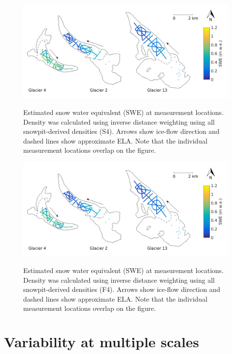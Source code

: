 \documentclass{sfuthesis}
\begin{document}
\begin{figure}[H]
	\centering
	\includegraphics[width = \textwidth]{SWEmap_opt8.png}\\
	\caption{Estimated snow water equivalent (SWE) at measurement locations. Density was calculated using inverse distance weighting using all snowpit-derived densities (S4). Arrows show ice-flow direction and dashed lines show approximate ELA. Note that the individual measurement locations overlap on the figure.}
	\label{fig:SWEmap_S4}
\end{figure}

\begin{figure}[H]
	\centering
	\includegraphics[width =\textwidth]{SWEmap_opt9.png}\\
	\caption{Estimated snow water equivalent (SWE) at measurement locations. Density was calculated using inverse distance weighting using all snowpit-derived densities (F4). Arrows show ice-flow direction and dashed lines show approximate ELA. Note that the individual measurement locations overlap on the figure.}
	\label{fig:SWEmap_F4}
\end{figure}


\section{Variability at multiple scales}
\end{document}
